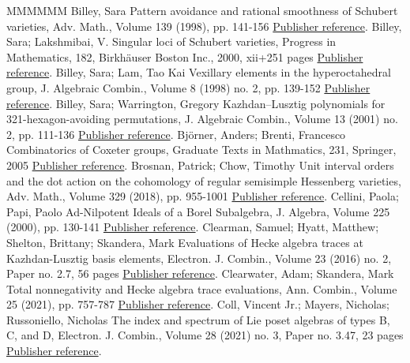 \begin{thebibliography}{MMMMMM}
 Billey, Sara Pattern avoidance and rational smoothness of Schubert varieties, Adv. Math., Volume 139 (1998), pp. 141-156 \href{https://alco.centre-mersenne.org/articles/10.5802/alco.459/#BilleyPattern}{Publisher reference}.
 Billey, Sara; Lakshmibai, V. Singular loci of Schubert varieties, Progress in Mathematics, 182, Birkhäuser Boston Inc., 2000, xii+251 pages \href{https://alco.centre-mersenne.org/articles/10.5802/alco.459/#BilleyLak}{Publisher reference}.
 Billey, Sara; Lam, Tao Kai Vexillary elements in the hyperoctahedral group, J. Algebraic Combin., Volume 8 (1998) no. 2, pp. 139-152 \href{https://alco.centre-mersenne.org/articles/10.5802/alco.459/#BilleyLamVex}{Publisher reference}.
 Billey, Sara; Warrington, Gregory Kazhdan–Lusztig polynomials for 321-hexagon-avoiding permutations, J. Algebraic Combin., Volume 13 (2001) no. 2, pp. 111-136 \href{https://alco.centre-mersenne.org/articles/10.5802/alco.459/#BWHex}{Publisher reference}.
 Björner, Anders; Brenti, Francesco Combinatorics of Coxeter groups, Graduate Texts in Mathmatics, 231, Springer, 2005 \href{https://alco.centre-mersenne.org/articles/10.5802/alco.459/#BBCoxeter}{Publisher reference}.
 Brosnan, Patrick; Chow, Timothy Unit interval orders and the dot action on the cohomology of regular semisimple Hessenberg varieties, Adv. Math., Volume 329 (2018), pp. 955-1001 \href{https://alco.centre-mersenne.org/articles/10.5802/alco.459/#BChowUIODot}{Publisher reference}.
 Cellini, Paola; Papi, Paolo Ad-Nilpotent Ideals of a Borel Subalgebra, J. Algebra, Volume 225 (2000), pp. 130-141 \href{https://alco.centre-mersenne.org/articles/10.5802/alco.459/#CelliniPapi}{Publisher reference}.
 Clearman, Samuel; Hyatt, Matthew; Shelton, Brittany; Skandera, Mark Evaluations of Hecke algebra traces at Kazhdan-Lusztig basis elements, Electron. J. Combin., Volume 23 (2016) no. 2, Paper no. 2.7, 56 pages \href{https://alco.centre-mersenne.org/articles/10.5802/alco.459/#CHSSkanEKL}{Publisher reference}.
 Clearwater, Adam; Skandera, Mark Total nonnegativity and Hecke algebra trace evaluations, Ann. Combin., Volume 25 (2021), pp. 757-787 \href{https://alco.centre-mersenne.org/articles/10.5802/alco.459/#CSkanTNNChar}{Publisher reference}.
 Coll, Vincent Jr.; Mayers, Nicholas; Russoniello, Nicholas The index and spectrum of Lie poset algebras of types B, C, and D, Electron. J. Combin., Volume 28 (2021) no. 3, Paper no. 3.47, 23 pages \href{https://alco.centre-mersenne.org/articles/10.5802/alco.459/#CMRIndexSpec}{Publisher reference}.

\end{thebibliography}

